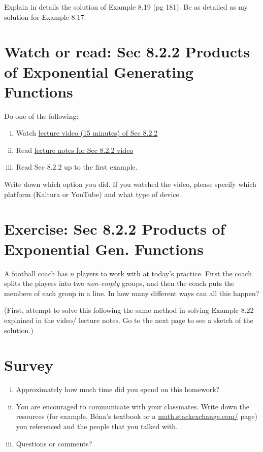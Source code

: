 \documentclass[12pt]{amsart}
\begin{document}
Explain in details the solution of Example 8.19 (pg 181). Be as detailed as my solution for Example 8.17.




\section{Watch or read: Sec 8.2.2 Products of Exponential Generating Functions}
Do one of the following:
\begin{enumerate}[i.]
	\item Watch \href{}{lecture video (15 minutes) of Sec 8.2.2}
	\item Read  \href{https://egunawan.github.io/combinatorics/notes/notes8_2_2products_of_exponential_generating_functions.pdf}{lecture notes for Sec 8.2.2 video}
	\item Read Sec 8.2.2 up to the first example.
\end{enumerate}

Write down which option you did. If you watched the video, please specify which platform (Kaltura or YouTube) and what type of device.


\section{Exercise: Sec 8.2.2 Products of Exponential Gen. Functions}
\label{sec:exercise:sec822}

A football coach has $n$ players to work with at today's practice.
First the coach splits the players into two \emph{non-empty} groups, and then the coach puts the members of each group in a line. 
In how many different ways can all this happen? 

(First, attempt to solve this following the same method in solving Example 8.22 explained in the video/ lecture notes. Go to the next page to see a sketch of the solution.)






\section{Survey}
\begin{enumerate}[i.] 
\item Approximately how much time did you spend on this homework?
\item You are encouraged to communicate with your classmates. Write down the resources (for example, B\'ona's textbook or a  \href{https://math.stackexchange.com/}{math.stackexchange.com/} page) you referenced and the people that you talked with.	
\item Questions or comments?
\end{enumerate}
\end{document}
